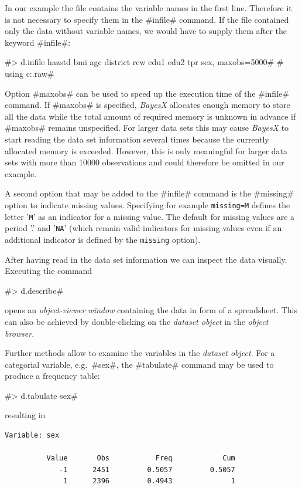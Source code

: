 \documentclass[11pt,a4paper,twoside]{bayesxreport}
\begin{document}
In our example the file contains the variable names in the first
line. Therefore it is not necessary to specify them in the #infile#
command. If the file contained only the data without variable names,
we would have to supply them after the keyword #infile#:

 #> d.infile hazstd bmi agc district rcw edu1 edu2 tpr sex, maxobs=5000#
 #  using c:\data\zambia.raw#


Option #maxobs# can be used to speed up the execution time of the
#infile# command. If #maxobs# is specified, {\it BayesX} allocates
enough memory to store all the data while the total amount of
required memory is unknown in advance if #maxobs# remains
unspecified. For larger data sets this may cause {\it BayesX} to
start reading the data set information several times because the
currently allocated memory is exceeded. However, this is only
meaningful for larger data sets with more than 10000 observations
and could therefore be omitted in our example.

A second option that may be added to the #infile# command is the
#missing# option to indicate missing values. Specifying for example
{\tt missing=M} defines the letter '{\tt M}' as an indicator for a
missing value. The default for missing values are a period '.' and
'{\tt NA}' (which remain valid indicators for missing values even if
an additional indicator is defined by the {\tt missing} option).

After having read in the data set information we can inspect the
data visually. Executing the command

#> d.describe#

opens an {\it object-viewer window} containing the data in form of a
spreadsheet. This can also be achieved by double-clicking on the
{\it dataset object} in the {\it object browser}.

Further methods allow to examine the variables in the {\it dataset
object}. For a categorial variable, e.g.~#sex#, the #tabulate#
command may be used to produce a frequency table:

#> d.tabulate sex#

resulting in

\begin{verbatim}
Variable: sex

          Value       Obs           Freq            Cum
             -1      2451         0.5057         0.5057
              1      2396         0.4943              1
\end{verbatim}
\end{document}
